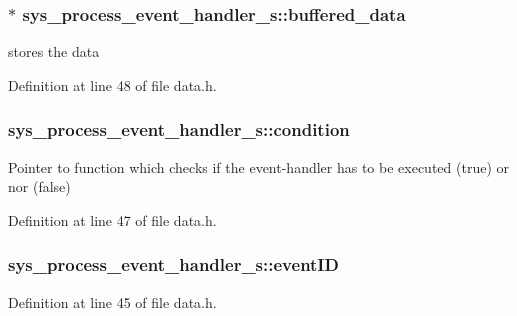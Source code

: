 \subsubsection[{buffered\+\_\+data}]{$\ast$ sys\+\_\+process\+\_\+event\+\_\+handler\+\_\+s\+::buffered\+\_\+data}\label{structsys__process__event__handler__s_adbcb330724f201fb328fb91d2c6353e3}
stores the data 

Definition at line 48 of file data.\+h.

\hypertarget{structsys__process__event__handler__s_a43ea89783cb8b5cfd0896410f1f7a691}{}
\subsubsection[{condition}]{ sys\+\_\+process\+\_\+event\+\_\+handler\+\_\+s\+::condition}\label{structsys__process__event__handler__s_a43ea89783cb8b5cfd0896410f1f7a691}
Pointer to function which checks if the event-\/handler has to be executed (true) or nor (false) 

Definition at line 47 of file data.\+h.

\hypertarget{structsys__process__event__handler__s_a4b799aaf40561daed132a1a1d688ecd8}{}
\subsubsection[{event\+I\+D}]{ sys\+\_\+process\+\_\+event\+\_\+handler\+\_\+s\+::event\+I\+D}\label{structsys__process__event__handler__s_a4b799aaf40561daed132a1a1d688ecd8}


Definition at line 45 of file data.\+h.

\hypertarget{structsys__process__event__handler__s_a980eeb4cb54ac72cd3ebc38e391c40a5}{}
